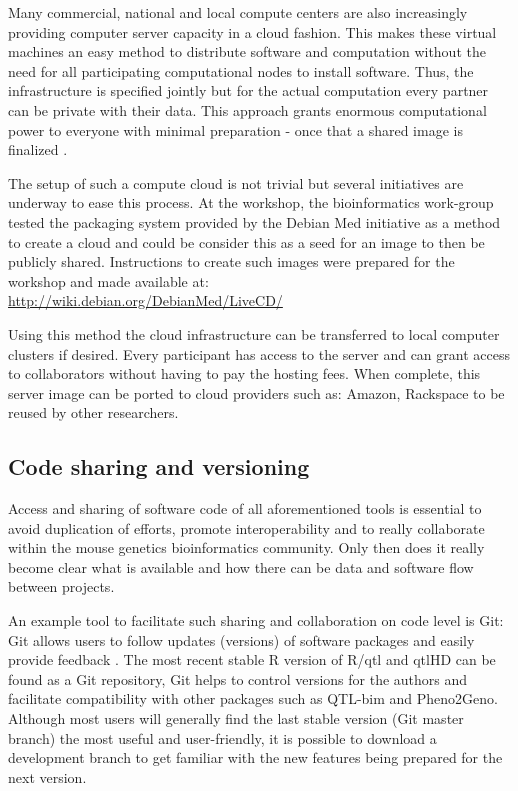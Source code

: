 Many commercial, national and local compute centers are also increasingly providing computer
server capacity in a cloud fashion. This makes these virtual machines an easy method to distribute 
software and computation without the need for all participating computational nodes to install 
software. Thus, the infrastructure is specified jointly \cite{Foster:2008} but for the actual computation every 
partner can be private with their data. This approach grants enormous computational power to 
everyone with minimal preparation - once that a shared image is finalized \cite{Krampis:2012}.

The setup of such a compute cloud is not trivial but several initiatives are underway to ease 
this process. At the workshop, the bioinformatics work-group tested the packaging system provided by 
the Debian Med initiative as a method to create a cloud and could be consider this as a seed 
for an image to then be publicly shared. Instructions to create such images were prepared for 
the workshop and made available at:\\
\url{http://wiki.debian.org/DebianMed/LiveCD/}
 
Using this method the cloud infrastructure can be transferred to local computer clusters 
if desired. Every participant has access to the server and can grant access to collaborators 
without having to pay the hosting fees. When complete, this server image can be ported to 
cloud providers such as: Amazon, Rackspace to be reused by other researchers.

\subsection{Code sharing and versioning}
\label{sect:CodeSharing}
Access and sharing of software code of all aforementioned tools is essential to avoid 
duplication of efforts, promote interoperability and to really collaborate within the mouse 
genetics bioinformatics community. Only then does it really become clear what is available 
and how there can be data and software flow between projects.

An example tool to facilitate such sharing and collaboration on code level is Git: Git 
allows users to follow updates (versions) of software packages and easily provide feedback \cite{Git:2007}. 
The most recent stable R version of R/qtl and qtlHD can be found as a Git repository, Git 
helps to control versions for the authors and facilitate compatibility with other packages 
such as QTL-bim and Pheno2Geno. Although most users will generally find the last stable version 
(Git master branch) the most useful and user-friendly, it is possible to download a 
development branch to get familiar with the new features being prepared for the next version.

